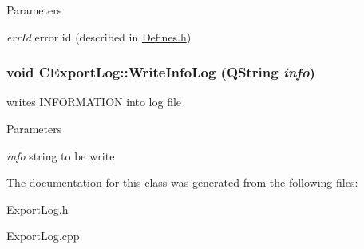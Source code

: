 \begin{DoxyParams}{Parameters}
\item[{\em errId}]error id (described in \hyperlink{Defines_8h_source}{Defines.h}) \end{DoxyParams}
\hypertarget{classCExportLog_a98759c11a550a90692af1fc21fc58c64}{
\subsubsection[{WriteInfoLog}]{\setlength{\rightskip}{0pt plus 5cm}void CExportLog::WriteInfoLog (QString {\em info})}}
\label{classCExportLog_a98759c11a550a90692af1fc21fc58c64}
writes INFORMATION into log file


\begin{DoxyParams}{Parameters}
\item[{\em info}]string to be write \end{DoxyParams}


The documentation for this class was generated from the following files:\begin{DoxyCompactItemize}
\item 
ExportLog.h\item 
ExportLog.cpp\end{DoxyCompactItemize}
